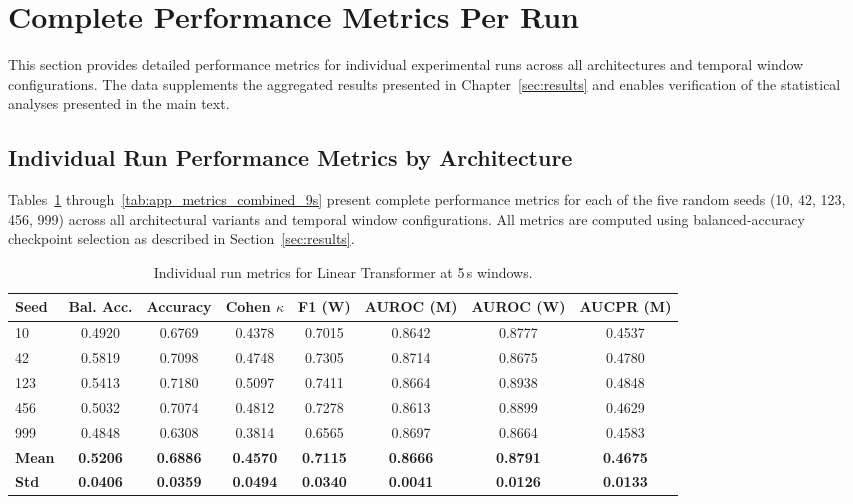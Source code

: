 \section{Complete Performance Metrics Per Run}
\label{app:complete_metrics_per_run}

This section provides detailed performance metrics for individual experimental runs across all architectures and temporal window configurations. The data supplements the aggregated results presented in Chapter~\ref{sec:results} and enables verification of the statistical analyses presented in the main text.

\subsection{Individual Run Performance Metrics by Architecture}

Tables~\ref{tab:app_metrics_linear_5s} through~\ref{tab:app_metrics_combined_9s} present complete performance metrics for each of the five random seeds (10, 42, 123, 456, 999) across all architectural variants and temporal window configurations. All metrics are computed using balanced-accuracy checkpoint selection as described in Section~\ref{sec:results}.

\begin{table}[htbp]
\centering
\caption{Individual run metrics for Linear Transformer at 5\,s windows.}
\label{tab:app_metrics_linear_5s}
\footnotesize
\setlength{\tabcolsep}{2.5pt}
\begin{tabular}{l | c | c | c | c | c | c | c}
\textbf{Seed} & \textbf{Bal. Acc.} & \textbf{Accuracy} & \textbf{Cohen \(\kappa\)} & \textbf{F1 (W)} & \textbf{AUROC (M)} & \textbf{AUROC (W)} & \textbf{AUCPR (M)} \\
\hline
10  & 0.4920 & 0.6769 & 0.4378 & 0.7015 & 0.8642 & 0.8777 & 0.4537 \\
42  & 0.5819 & 0.7098 & 0.4748 & 0.7305 & 0.8714 & 0.8675 & 0.4780 \\
123 & 0.5413 & 0.7180 & 0.5097 & 0.7411 & 0.8664 & 0.8938 & 0.4848 \\
456 & 0.5032 & 0.7074 & 0.4812 & 0.7278 & 0.8613 & 0.8899 & 0.4629 \\
999 & 0.4848 & 0.6308 & 0.3814 & 0.6565 & 0.8697 & 0.8664 & 0.4583 \\
\hline
\textbf{Mean} & \textbf{0.5206} & \textbf{0.6886} & \textbf{0.4570} & \textbf{0.7115} & \textbf{0.8666} & \textbf{0.8791} & \textbf{0.4675} \\
\textbf{Std} & \textbf{0.0406} & \textbf{0.0359} & \textbf{0.0494} & \textbf{0.0340} & \textbf{0.0041} & \textbf{0.0126} & \textbf{0.0133} \\
\hline
\end{tabular}
\setlength{\tabcolsep}{6pt}
\end{table}

